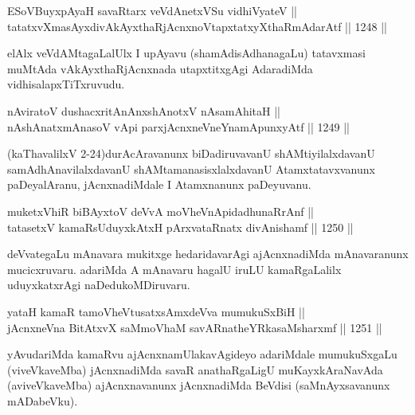 \begin{shl}
ESoV\s BuyxpAyaH savaRtarx veVdAnetxVSu vidhiVyateV || \\
tatatxvXmasAyxdivAkAyxthaRjAcnxnoVtapxtatxyXthaRmAdarAtf \hfill || 1248 ||  
\end{shl}

\begin{artha}
elAlx veVdAMtagaLalUlx I upAyavu (shamAdisAdhanagaLu) tatavxmasi muMtAda vAkAyxthaRjAcnxnada utapxtitxgAgi AdaradiMda vidhisalapxTiTxruvudu.
\end{artha}


\begin{shl}
nAviratoV dushacxritAnAnxshAnotxV nAsamAhitaH || \\
nAshAnatxmAnasoV vA\s pi parxjAcnxneVneYnamApunxyAtf \hfill || 1249 ||  
\end{shl}

\begin{artha}
(kaThavalilxV 2-24)durAcAravanunx biDadiruvavanU shAMtiyilalxdavanU samAdhAnavilalxdavanU shAMtamanasisxlalxdavanU Atamxtatavxvanunx paDeyalAranu, jAcnxnadiMdale I Atamxnanunx paDeyuvanu.
\end{artha}


\begin{shl}
muketxVhiR biBAyxtoV deVvA moVheVnApidadhunaRrAnf || \\
tatasetxV kamaRsUduyxkAtxH pArxvataRnatx divAnishamf \hfill || 1250 ||  
\end{shl}

\begin{artha}
deVvategaLu mAnavara mukitxge hedaridavarAgi ajAcnxnadiMda mAnavaranunx mucicxruvaru. adariMda A mAnavaru hagalU iruLU kamaRgaLalilx uduyxkatxrAgi naDedukoMDiruvaru.
\end{artha}


\begin{shl}
yataH kamaR tamoVheVtusatxsAmxdeVva mumukuSxBiH || \\
jAcnxneVna BitAtxvX saMmoVhaM savARnatheYRkasaMsharxmf \hfill || 1251 ||  
\end{shl}

\begin{artha}
yAvudariMda kamaRvu ajAcnxnamUlakavAgideyo adariMdale mumukuSxgaLu (viveVkaveMba) jAcnxnadiMda savaR anathaRgaLigU muKayxkAraNavAda (aviveVkaveMba) ajAcnxnavanunx jAcnxnadiMda BeVdisi (saMnAyxsavanunx mADabeVku).
\end{artha}

